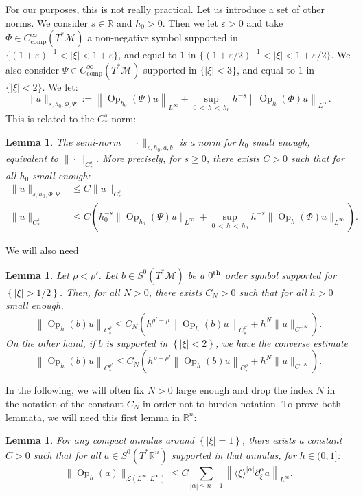 \documentclass[10pt]{amsart}
\newtheorem{lemm}[theo]{Lemma}\newtheorem{prop}[theo]{Proposition}\newtheorem{coro}[theo]{Corollary}\newtheorem{conj}[theo]{Conjecture}
\theoremstyle{definition}\newtheorem{defi}[theo]{Definition}\newtheorem{rema}[theo]{Remark}\newtheorem{exam}[theo]{Example}\newtheorem{exem}[theo]{Example}\newtheorem{nota}[theo]{Notation}
\newcommand{\R}{\mathbb{R}}
\newcommand{\eps}{\varepsilon}
\newcommand{\mc}{\mathcal}
\newcommand{\M}{\mathcal{M}}
\newcommand{\comp}{\mathrm{comp}}
\DeclareMathOperator{\Op}{Op}
\begin{document}
For our purposes, this is not really practical. Let us introduce a set of other norms. We consider $s\in \R$ and $h_0>0$. Then we let $\eps>0$ and take $\Phi \in C^\infty_{\comp}(T^*\M)$ a non-negative symbol supported in $\{(1+\eps)^{-1} <|\xi|< 1+\eps\}$, and equal to $1$ in $\{ (1+\eps/2)^{-1} < |\xi|< 1+\eps/2\}$. We also consider $\Psi \in C^\infty_{\comp}(T^*\M)$ supported in $\{ |\xi|< 3\}$, and equal to $1$ in $\{ |\xi|<2\}$. We let:
\[
\| u \|_{s,h_0,\Phi,\Psi} := \left\| \Op_{h_0}(\Psi) u \right\|_{L^\infty} + \sup_{0\,<\,h\,<\,h_0} h^{-s}\left\|\Op_h(\Phi)u\right\|_{L^\infty}.
\]
This is related to the $C^s_\ast$ norm:

\begin{lemm}\label{lemma:comparaison-norm}
The semi-norm $\| \cdot \|_{s,h_0,a,b}$ is a norm for $h_0$ small enough, equivalent to $\|\cdot\|_{C^s_\ast}$. More precisely, for $s\geq 0$, there exists $C > 0$ such that for all $h_0$ small enough:
\begin{align*}
\| u \|_{s,h_0,\Phi,\Psi} &\leq C \| u \|_{C^s_\ast} \\
\| u \|_{C^s_\ast} &\leq C \left(h_0^{-s}\| \Op_{h_0}(\Psi) u \|_{L^\infty} + \sup_{0\,<\,h\,<\,h_0} h^{-s}\|\Op_h(\Phi)u\|_{L^\infty}\right).
\end{align*}
\end{lemm}

We will also need

\begin{lemm}\label{lemma:comparaison-rho-rho'}
Let $\rho < \rho'$. Let $b \in S^0(T^*\M)$ be a $0^{\rm th}$ order symbol supported for $\left\{|\xi|>1/2\right\}$. Then, for all $N > 0$, there exists $C_N > 0$ such that for all $h>0$ small enough,
\[
\left\| \Op_h(b) u \right\|_{C^{\rho}_\ast} \leq C_N \left(h^{\rho'-\rho} \left\| \Op_h(b) u \right\|_{C^{\rho'}_\ast} + h^N \|u\|_{C^{-N}}\right).
\]
On the other hand, if $b$ is supported in $\left\{|\xi|<2\right\}$, we have the converse estimate
\[
\left\| \Op_h(b) u \right\|_{C^{\rho'}_\ast} \leq C_N \left(h^{\rho-\rho'} \left\| \Op_h(b) u \right\|_{C^{\rho}_\ast} + h^N \|u\|_{C^{-N}}\right).
\]
\end{lemm}

In the following, we will often fix $N > 0$ large enough and drop the index $N$ in the notation of the constant $C_N$ in order not to burden notation. To prove both lemmata, we will need this first lemma in $\R^n$:

\begin{lemm}\label{lemma:boundedness-phi}
For any compact annulus around $\left\{|\xi|=1\right\}$, there exists a constant $C > 0$ such that for all $a \in S^0(T^*\R^n)$ supported in that annulus, for $h\in(0,1]$:
\[
\|\Op_h(a)\|_{\mc{L}\left(L^\infty,L^\infty\right)} \leq C \sum_{|\alpha| \leq n +1} \left\|\langle \xi \rangle^{|\alpha|} \partial^\alpha_\xi a\right\|_{L^\infty}.
\]
\end{lemm}
\end{document}

